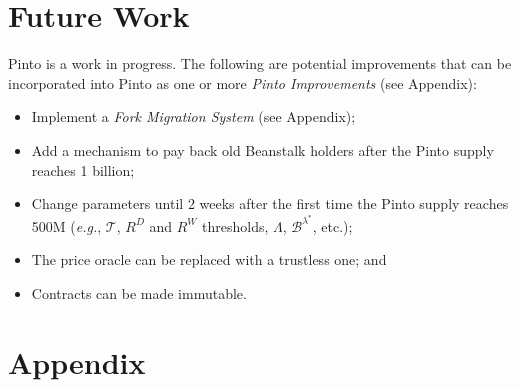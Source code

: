 \documentclass[tikz]{article}
\newcommand{\term}[1]{\textsl{#1}}
\begin{document}
\section{Future Work}

Pinto is a work in progress. The following are potential improvements that can be incorporated into Pinto as one or more \term{Pinto Improvements} (see Appendix):

\begin{itemize}
    \item Implement a \term{Fork Migration System} (see Appendix);
    \item Add a mechanism to pay back old Beanstalk holders after the Pinto supply reaches 1 billion;
    \item Change parameters until 2 weeks after the first time the Pinto supply reaches 500M (\textit{e.g.}, $\mathscr{T}$, $R^{D}$ and $R^{W}$ thresholds, $\Lambda$, $\mathscr{B}^{\lambda^{*}}$, etc.);
    \item The price oracle can be replaced with a trustless one; and
    \item Contracts can be made immutable.
\end{itemize}


\newpage
\section{Appendix}

\newpage

\newpage

\newpage

\newpage

\newpage

\newpage

\newpage

\newpage

\newpage

\newpage

\newpage

\newpage

\newpage
\end{document}
